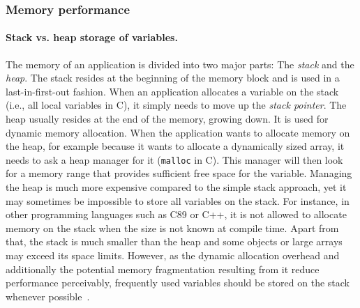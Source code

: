 \subsubsection{Memory performance}
\label{memory_performance}
\paragraph{Stack vs. heap storage of variables.} The memory of an application is divided into two major parts: The \emph{stack} and the \emph{heap}. The stack resides at the beginning of the memory block and is used in a last-in-first-out fashion. When an application allocates a variable on the stack (i.e., all local variables in C), it simply needs to move up the \emph{stack pointer}. The heap usually resides at the end of the memory, growing down. It is used for dynamic memory allocation. When the application wants to allocate memory on the heap, for example because it wants to allocate a dynamically sized array, it needs to ask a heap manager for it (\texttt{malloc} in C). This manager will then look for a memory range that provides sufficient free space for the variable. Managing the heap is much more expensive compared to the simple stack approach, yet it may sometimes be impossible to store all variables on the stack. For instance, in other programming languages such as C89 or C++, it is not allowed to allocate memory on the stack when the size is not known at compile time. Apart from that, the stack is much smaller than the heap and some objects or large arrays may exceed its space limits. However, as the dynamic allocation overhead and additionally the potential memory fragmentation resulting from it reduce performance perceivably, frequently used variables should be stored on the stack whenever possible~\cite[p. 90]{fog2011optimizing}.

